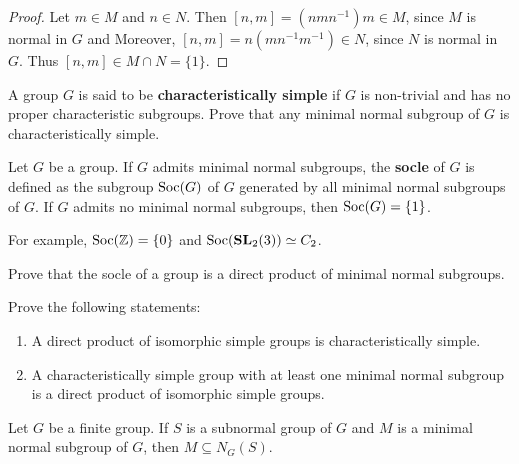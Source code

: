 \begin{proof}
	Let $m\in M$ and $n\in N$. Then $[n,m]=(nmn^{-1})m\in M$, since $M$ is normal in $G$ and 
	Moreover, $[n,m]=n(mn^{-1}m^{-1})\in N$, since $N$ is normal in 
	$G$. Thus $[n,m]\in M\cap N=\{1\}$.
\end{proof}

\begin{exercise}
\label{xca:characteristically_simple}
    A group $G$ is said to be \textbf{characteristically simple} if $G$ is non-trivial 
    and has no proper characteristic subgroups. 
    Prove that any minimal normal subgroup of $G$ is characteristically simple. 
\end{exercise}

\begin{definition}
    Let $G$ be a group. If $G$ admits minimal normal subgroups, the \textbf{socle} of $G$ 
    is defined as the subgroup $\operatorname{Soc}(G)$ of $G$ generated by all minimal normal subgroups of $G$. If $G$ admits no minimal normal subgroups, 
    then $\operatorname{Soc}(G)=\{1\}$. 
\end{definition}

For example, $\operatorname{Soc}(\mathbb{Z})=\{0\}$ and $\operatorname{Soc}(\mathbf{SL}_2(3))\simeq C_2$. 

\begin{exercise}
\label{xca:Soc_direct_product}
    Prove that the socle of a group is a direct product of minimal normal subgroups. 
\end{exercise}

\begin{exercise}
\label{xca:caracteristically_simple}
Prove the following statements:
    \begin{enumerate}
        \item A direct product of isomorphic simple groups is characteristically simple.
        \item A characteristically simple group with at least one minimal normal subgroup is a direct product of isomorphic simple groups. 
    \end{enumerate}
\end{exercise}

\begin{theorem}[Wielandt]
	\label{thm:MsubsetNG(S)}
	Let $G$ be a finite group. If $S$ is a subnormal group of $G$ and 
	$M$ is a minimal normal subgroup of $G$, then $M\subseteq N_G(S)$.
\end{theorem}

